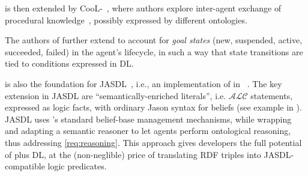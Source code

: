 \documentclass[
]{ceurart}
\begin{document}
\agentspeakdl{} is then extended by CooL-\agentspeak{}~\cite{DBLP:journals/wias/MascardiABBR14},
where authors explore inter-agent exchange of procedural knowledge~\cite{DBLP:conf/dalt/AnconaM03},
possibly expressed by different ontologies.
%

The authors of \cite{DBLP:conf/iat/HalacED11} further extend \agentspeakdl{}
to account for \emph{goal states}
(new, suspended, active, succeeded, failed)
in the agent's lifecycle,
in such a way that state transitions are tied to conditions expressed in \ac{DL}.
%


\agentspeakdl{} is also the foundation for JASDL~\cite{DBLP:conf/dalt/KlapiscakB08},
i.e., an implementation of \agentspeakdl{} in \jason{}~\cite{bordini2007programming}.
%
The key extension in JASDL are ``semantically-enriched literals'', 
i.e. $\mathcal{ALC}$ statements, 
expressed as logic facts,
with ordinary Jason syntax for beliefs
(see example in ).
%
%
JASDL uses \jason{}'s standard belief-base management mechanisms,
while wrapping and adapting a semantic reasoner to let agents perform ontological reasoning,
thus addressing \ref{req:reasoning}.
%
This approach gives developers the full potential of \jason{} plus \ac{DL}, 
at the (non-neglible) price of translating \ac{RDF} triples into JASDL-compatible logic predicates.
%

\end{document}
